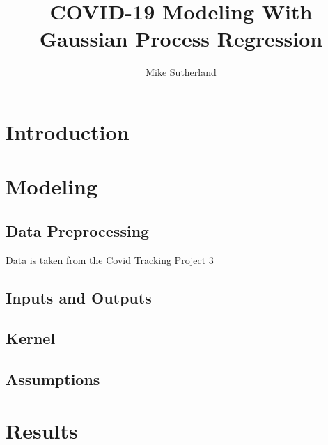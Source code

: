\documentclass[11pt,letterpaper]{article}
\author{Mike Sutherland}
\title{COVID-19 Modeling With Gaussian Process Regression}
\begin{document}
	\section{Introduction}
	\section{Modeling}
		\subsection{Data Preprocessing}
		\par Data is taken from the Covid Tracking Project \cref{}
		\subsection{Inputs and Outputs}
		\subsection{Kernel}
		\subsection{Assumptions}
	\section{Results}
\end{document}
